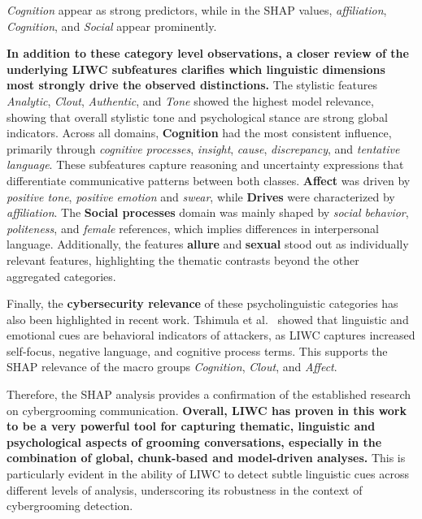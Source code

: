 \textit{Cognition} appear as strong predictors, while in the SHAP values, \textit{affiliation}, \textit{Cognition}, and \textit{Social} appear prominently. 

\textbf{In addition to these category level observations, a closer review of the underlying LIWC subfeatures clarifies which linguistic dimensions most strongly drive the observed distinctions.} The stylistic features \textit{Analytic}, \textit{Clout}, \textit{Authentic}, and \textit{Tone} showed the highest model relevance, showing that overall stylistic tone and psychological stance are strong global indicators. Across all domains, \textbf{Cognition} had the most consistent influence, primarily through \textit{cognitive processes}, \textit{insight}, \textit{cause}, \textit{discrepancy}, and \textit{tentative language}. These subfeatures capture reasoning and uncertainty expressions that differentiate communicative patterns between both classes. \textbf{Affect} was driven by \textit{positive tone}, \textit{positive emotion} and \textit{swear}, while \textbf{Drives} were characterized by \textit{affiliation}. The \textbf{Social processes} domain was mainly shaped by \textit{social behavior}, \textit{politeness}, and \textit{female} references, which implies differences in interpersonal language. Additionally, the features \textbf{allure} and \textbf{sexual} stood out as individually relevant features, highlighting the thematic contrasts beyond the other aggregated categories. 

Finally, the \textbf{cybersecurity relevance} of these psycholinguistic categories has also been highlighted in recent work. Tshimula et al.~\cite{tshimula2024psychologicalprofilingcybersecuritylook} showed that linguistic and emotional cues are behavioral indicators of attackers, as LIWC captures increased self-focus, negative language, and cognitive process terms. This supports the SHAP relevance of the macro groups \textit{Cognition}, \textit{Clout}, and \textit{Affect}. 

Therefore, the SHAP analysis provides a confirmation of the established research on cybergrooming communication. \textbf{Overall, LIWC has proven in this work to be a very powerful tool for capturing thematic, linguistic and psychological aspects of grooming conversations, especially in the combination of global, chunk-based and model-driven analyses.} This is particularly evident in the ability of LIWC to detect subtle linguistic cues across different levels of analysis, underscoring its robustness in the context of cybergrooming detection.

